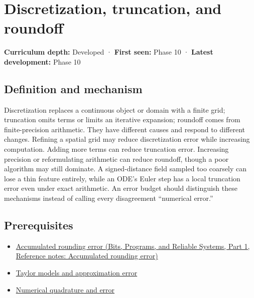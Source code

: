 \hypertarget{appendix-6b0648b2b8e8}{}\label{referencestart:appendix-6b0648b2b8e8}
\section{Discretization, truncation, and roundoff}\label{appendix-6b0648b2b8e8-discretization-truncation-and-roundoff}

\hypertarget{appendix-6b0648b2b8e8-discretization-truncation-and-roundoff}{}

\textbf{Curriculum depth:} Developed · \textbf{First seen:} Phase 10 · \textbf{Latest development:} Phase 10

\begin{allmightroledefinition}

\subsection{Definition and mechanism}\label{appendix-6b0648b2b8e8-definition-and-mechanism}

\hypertarget{appendix-6b0648b2b8e8-definition-and-mechanism}{}

Discretization replaces a continuous object or domain with a finite grid; truncation omits terms or limits an iterative expansion; roundoff comes from finite-precision arithmetic. They have different causes and respond to different changes. Refining a spatial grid may reduce discretization error while increasing computation. Adding more terms can reduce truncation error. Increasing precision or reformulating arithmetic can reduce roundoff, though a poor algorithm may still dominate. A signed-distance field sampled too coarsely can lose a thin feature entirely, while an ODE's Euler step has a local truncation error even under exact arithmetic. An error budget should distinguish these mechanisms instead of calling every disagreement ``numerical error.''

\end{allmightroledefinition}

\subsection{Prerequisites}\label{appendix-6b0648b2b8e8-prerequisites}

\hypertarget{appendix-6b0648b2b8e8-prerequisites}{}

\begin{itemize}
\tightlist
\item
  \href{../01-Bits-Programs-and-Reliable-Systems-P01/main.pdf\#nameddest=appendix-f82e270791c8}{Accumulated rounding error (Bits, Programs, and Reliable Systems, Part 1, Reference notes: Accumulated rounding error)}
\item
  \hyperref[appendix-32f39e9a3738]{Taylor models and approximation error}
\item
  \hyperref[appendix-80521eae6b71]{Numerical quadrature and error}
\end{itemize}

